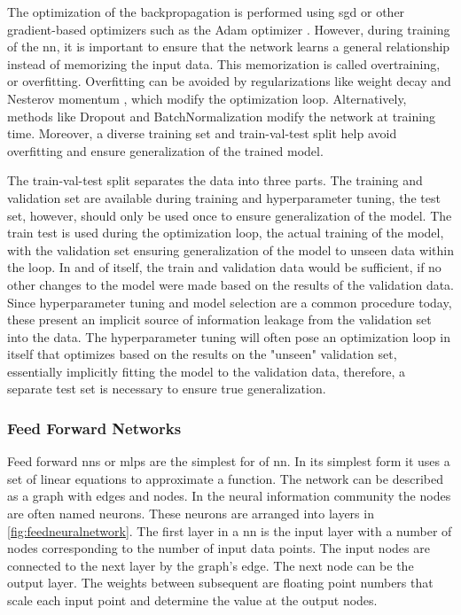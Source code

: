 The optimization of the backpropagation is performed using \ac{sgd} or other gradient-based optimizers such as the Adam optimizer \citep{kingma2014adam}. However, during training of the \ac{nn}, it is important to ensure that the network learns a general relationship instead of memorizing the input data. This memorization is called overtraining, or overfitting. Overfitting can be avoided by regularizations like weight decay \citep{krogh1992simple} and Nesterov momentum \citep{pmlr-v28-sutskever13}, which modify the optimization loop. Alternatively, methods like Dropout \citep{hinton2012improving} and BatchNormalization \citep{ioffe2015batch} modify the network at training time. Moreover, a diverse training set and train-val-test split help avoid overfitting and ensure generalization of the trained model.

The train-val-test split separates the data into three parts. The training and validation set are available during training and hyperparameter tuning, the test set, however, should only be used once to ensure generalization of the model. The train test is used during the optimization loop, the actual training of the model, with the validation set ensuring generalization of the model to unseen data within the loop. In and of itself, the train and validation data would be sufficient, if no other changes to the model were made based on the results of the validation data. Since hyperparameter tuning and model selection are a common procedure today, these present an implicit source of information leakage from the validation set into the data. The hyperparameter tuning will often pose an optimization loop in itself that optimizes based on the results on the "unseen" validation set, essentially implicitly fitting the model to the validation data, therefore, a separate test set is necessary to ensure true generalization.


\subsubsection{Feed Forward Networks}
Feed forward \acfp{nn} or \acp{mlp} are the simplest for of \ac{nn}. In its simplest form it uses a set of linear equations to approximate a function. The network can be described as a graph with edges and nodes. In the neural information community the nodes are often named neurons. These neurons are arranged into layers in \cref{fig:feedneuralnetwork}. The first layer in a \ac{nn} is the input layer with a number of nodes corresponding to the number of input data points. The input nodes are connected to the next layer by the graph's edge. The next node can be the output layer. The weights between subsequent are floating point numbers that scale each input point and determine the value at the output nodes.


